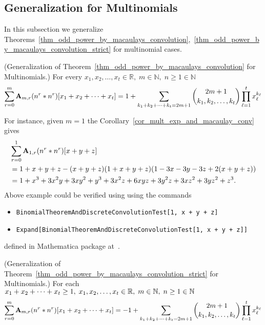\subsection{Generalization for Multinomials} \label{subsec:generalization-for-multinomials}
In this subsection we generalize
Theorems~\ref{thm_odd_power_by_macaulays_convolution},~\ref{thm_odd_power_by_macaulays_convolution_strict}
for multinomial cases.
\begin{cor}
    \label{cor_mult_exp_and_macaulay_conv}
    (Generalization of Theorem~\ref{thm_odd_power_by_macaulays_convolution} for Multinomials.)
    For every $x_1, x_2, \ldots, x_t\in\mathbb{R}, \; m\in\mathbb{N}, \; n\geq1\in\mathbb{N}$
    \[
        \sum_{r=0}^{m} \coeffA{m}{r} \convPower{n}{r}{\multifoldSum{t}} =
        1 + \sum_{\multifoldSum[k]{t}=2m+1} \binom{2m+1}{k_1, k_2,\ldots, k_t} \prod_{\ell=1}^{t} x_\ell^{k_\ell}
    \]
\end{cor}
For instance, given $m=1$ the Corollary~\ref{cor_mult_exp_and_macaulay_conv} gives
\begin{equation*}
    \begin{split}
        &\sum_{r=0}^{1} \coeffA{1}{r} \convPower{n}{r}{x+y+z} \\
        &=1 + x + y + z - (x + y + z) (1 + x + y + z) (1 - 3 x - 3 y - 3 z + 2 (x + y + z)) \\
        &=1 + x^3 + 3 x^2 y + 3 x y^2 + y^3 + 3 x^2 z + 6 x y z + 3 y^2 z + 3 x z^2 + 3 y z^2 + z^3.
    \end{split}
\end{equation*}
Above example could be verified using using the commands
\begin{itemize}
    \item \texttt{BinomialTheoremAndDiscreteConvolutionTest[1, x + y + z]}
    \item \texttt{Expand[BinomialTheoremAndDiscreteConvolutionTest[1, x + y + z]]}
\end{itemize}
defined in Mathematica package at~\cite{PK22Source}.
\begin{cor}
    \label{cor_mult_exp_and_macaulay_conv_strict}
    (Generalization of Theorem~\ref{thm_odd_power_by_macaulays_convolution_strict} for Multinomials.)
    For each $\multifoldSum{t} \geq 1, \; x_1,x_2,\ldots,x_t\in\mathbb{R}, \; m\in\mathbb{N}, \; n\geq1\in\mathbb{N}$
    \[
        \sum_{r=0}^{m} \coeffA{m}{r} \convPower{n}{r}{\multifoldSum{t}} =
        -1 + \sum_{\multifoldSum[k]{t}=2m+1} \binom{2m+1}{k_1, k_2,\ldots, k_t} \prod_{\ell=1}^{t} x_\ell^{k_\ell}
    \]
\end{cor}
